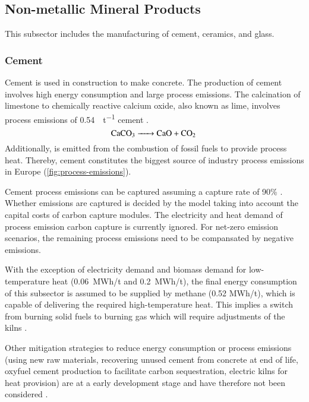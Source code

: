 \subsection{Non-metallic Mineral Products}
\label{sec:si:industry:nmmp}

This subsector includes the manufacturing of cement, ceramics, and glass.

\subsubsection*{Cement}

Cement is used in construction to make concrete. The production of cement
involves high energy consumption and large process emissions. The calcination of
limestone to chemically reactive calcium oxide, also known as lime, involves
process emissions of \SI{0.54}{\tco\per\tonne} cement .
\begin{equation}
    \ce{CaCO3 -> CaO + \co}
\end{equation}
Additionally, \co is emitted from the combustion of fossil fuels to provide
process heat. Thereby, cement constitutes the biggest source of industry
process emissions in Europe (\cref{fig:process-emissions}).

Cement process emissions can be captured assuming a capture rate of 90\%
. Whether emissions are captured is decided by the model taking
into account the capital costs of carbon capture modules. The electricity and
heat demand of process emission carbon capture is currently ignored. For
net-zero emission scenarios, the remaining process emissions need to be
compansated by negative emissions.

With the exception of electricity demand and biomass demand for low-temperature
heat (0.06~MWh/t and 0.2~MWh/t), the final energy consumption of this subsector is assumed to be supplied
by methane (0.52 MWh/t), which is capable of delivering the required high-temperature heat.
This implies a switch from burning solid fuels to burning gas which will require
adjustments of the kilns .

Other mitigation strategies to reduce energy consumption or process emissions
(using new raw materials, recovering unused cement from concrete at end of life,
oxyfuel cement production to facilitate carbon
sequestration, electric kilns for heat
provision) are at a early development stage and have therefore not been
considered .

